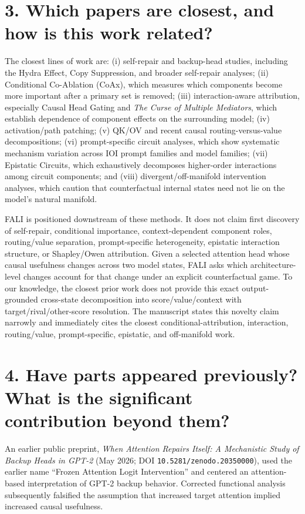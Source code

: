 \documentclass[11pt]{article}
\begin{document}
\section*{3. Which papers are closest, and how is this work related?}

The closest lines of work are: (i) self-repair and backup-head studies, including the Hydra Effect, Copy Suppression, and broader self-repair analyses; (ii) Conditional Co-Ablation (CoAx), which measures which components become more important after a primary set is removed; (iii) interaction-aware attribution, especially Causal Head Gating and \emph{The Curse of Multiple Mediators}, which establish dependence of component effects on the surrounding model; (iv) activation/path patching; (v) QK/OV and recent causal routing-versus-value decompositions; (vi) prompt-specific circuit analyses, which show systematic mechanism variation across IOI prompt families and model families; (vii) Epistatic Circuits, which exhaustively decomposes higher-order interactions among circuit components; and (viii) divergent/off-manifold intervention analyses, which caution that counterfactual internal states need not lie on the model's natural manifold.

FALI is positioned downstream of these methods. It does not claim first discovery of self-repair, conditional importance, context-dependent component roles, routing/value separation, prompt-specific heterogeneity, epistatic interaction structure, or Shapley/Owen attribution. Given a selected attention head whose causal usefulness changes across two model states, FALI asks which architecture-level changes account for that change under an explicit counterfactual game. To our knowledge, the closest prior work does not provide this exact output-grounded cross-state decomposition into score/value/context with target/rival/other-score resolution. The manuscript states this novelty claim narrowly and immediately cites the closest conditional-attribution, interaction, routing/value, prompt-specific, epistatic, and off-manifold work.

\section*{4. Have parts appeared previously? What is the significant contribution beyond them?}

An earlier public preprint, \emph{When Attention Repairs Itself: A Mechanistic Study of Backup Heads in GPT-2} (May 2026; DOI \texttt{10.5281/zenodo.20350000}), used the earlier name ``Frozen Attention Logit Intervention'' and centered an attention-based interpretation of GPT-2 backup behavior. Corrected functional analysis subsequently falsified the assumption that increased target attention implied increased causal usefulness.
\end{document}

